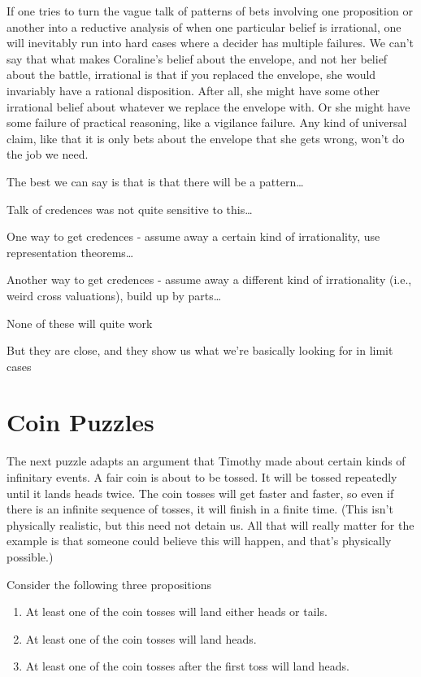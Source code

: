 \documentclass[11pt,]{book}
\providecommand{\tightlist}{%
  \setlength{\itemsep}{0pt}\setlength{\parskip}{0pt}}
\begin{document}
If one tries to turn the vague talk of patterns of bets involving one proposition or another into a reductive analysis of when one particular belief is irrational, one will inevitably run into hard cases where a decider has multiple failures. We can't say that what makes Coraline's belief about the envelope, and not her belief about the battle, irrational is that if you replaced the envelope, she would invariably have a rational disposition. After all, she might have some other irrational belief about whatever we replace the envelope with. Or she might have some failure of practical reasoning, like a vigilance failure. Any kind of universal claim, like that it is only bets about the envelope that she gets wrong, won't do the job we need.

The best we can say is that is that there will be a pattern\ldots{}

Talk of credences was not quite sensitive to this\ldots{}

One way to get credences - assume away a certain kind of irrationality, use representation theorems\ldots{}

Another way to get credences - assume away a different kind of irrationality (i.e., weird cross valuations), build up by parts\ldots{}

None of these will quite work

But they are close, and they show us what we're basically looking for in limit cases

\hypertarget{lockecoin}{%
\section{Coin Puzzles}\label{lockecoin}}

The next puzzle adapts an argument that Timothy \citet{Williamson2007} made about certain kinds of infinitary events. A fair coin is about to be tossed. It will be tossed repeatedly until it lands heads twice. The coin tosses will get faster and faster, so even if there is an infinite sequence of tosses, it will finish in a finite time. (This isn't physically realistic, but this need not detain us. All that will really matter for the example is that someone could believe this will happen, and that's physically possible.)

Consider the following three propositions

\begin{enumerate}
\def\labelenumi{(\Alph{enumi})}
\tightlist
\item
  At least one of the coin tosses will land either heads or tails.
\item
  At least one of the coin tosses will land heads.
\item
  At least one of the coin tosses after the first toss will land heads.
\end{enumerate}
\end{document}
